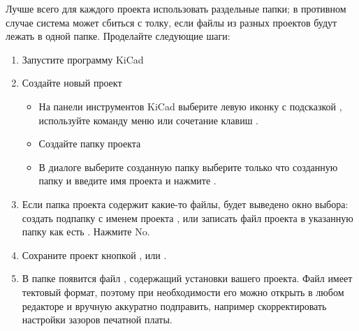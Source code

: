 
\bigskip
Лучше всего для каждого проекта использовать раздельные папки; в противном
случае система может сбиться с толку, если файлы из разных проектов будут лежать
в одной папке. Проделайте следующие шаги:

\begin{enumerate}
  \item Запустите программу KiCad  
  \item Создайте новый проект
  \begin{itemize}
    \item На панели инструментов KiCad выберите левую иконку с подсказкой
, используйте команду меню
 или сочетание клавиш .
  \item Создайте папку проекта 
    \item
В диалоге  выберите созданную папку
выберите только что созданную папку  и
введите имя проекта  и нажмите .
  \end{itemize}
	\item
Если папка проекта содержит какие-то файлы, будет выведено окно выбора:
создать подпапку с именем проекта , или записать файл проекта
в указанную папку как есть . Нажмите No.
    \item
Сохраните проект кнопкой ,  или .
	\item
В папке появится файл , содержащий установки вашего
проекта. Файл имеет тектовый формат, поэтому при необходимости его можно открыть
в любом редакторе и вручную аккуратно подправить, например скорректировать
настройки зазоров печатной платы.
\end{enumerate}
